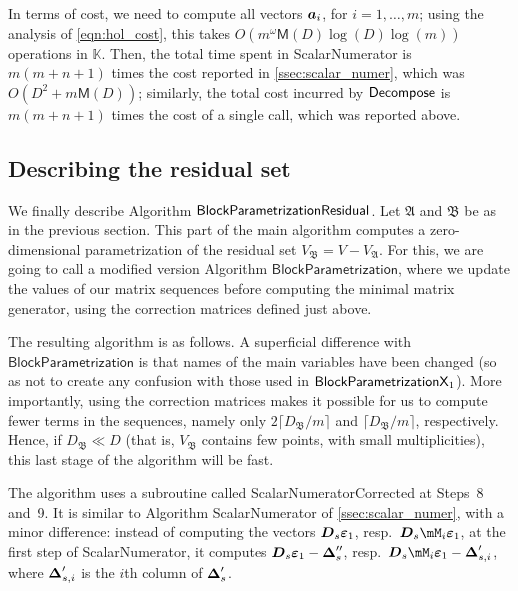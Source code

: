 \documentclass[12pt]{article}
\newcommand{\mat}[1]{\bm{\MakeUppercase{#1}}} %
\newcommand{\row}[1]{\bm{\MakeLowercase{#1}}} %
\newcommand{\col}[1]{\bm{\MakeLowercase{#1}}} %
\newcommand{\mainalgoname}{\mathsf{ BlockParametrization}}
\def\M {\ensuremath{\mathsf{M}}}
\def\K{\mathbb{K}}
\def\K {\ensuremath{\mathbb{K}}}
\begin{document}
In terms of cost, we need to compute all vectors $\row{a}_i$, for
$i=1,\dots,m$; using the analysis of \cref{eqn:hol_cost}, this takes
$O(m^{\omega} \M(D) \log(D) \log(m))$ operations in $\K$.  Then, the total time
spent in {\sf ScalarNumerator} is $m(m+n+1)$ times the cost reported in
\cref{ssec:scalar_numer}, which was $O(D^2 + m\M(D))$; similarly, the total
cost incurred by ${\sf Decompose}$ is $m(m+n+1)$ times the cost of a single
call, which was reported above.


\subsection{Describing the residual set}
 
We finally describe Algorithm $\mainalgoname{\sf Residual}$.  Let
$\mathfrak{A}$ and $\mathfrak{B}$ be as in the previous section.  This
part of the main algorithm computes a zero-dimensional parametrization
of the residual set $V_\mathfrak{B}=V-V_\mathfrak{A}$. For this, we
are going to call a modified version Algorithm
$\mathsf{BlockParametrization}$, where we update the values of our
matrix sequences before computing the minimal matrix generator, using
the correction matrices defined just above.

The resulting algorithm is as follows. A superficial difference with
$\mathsf{BlockParametrization}$ is that names of the main variables
have been changed (so as not to create any confusion with those used
in $\mainalgoname{\sf X}_1$). More importantly, using the correction
matrices makes it possible for us to compute fewer terms in the
sequences, namely only $2\lceil D_\mathfrak{B}/m\rceil$ and
$\lceil D_\mathfrak{B}/m\rceil$, respectively. Hence, if $D_\mathfrak{B} \ll D$
(that is, $V_\mathfrak{B}$ contains few points, with small
multiplicities), this last stage of the algorithm will be fast.

The algorithm uses a subroutine called {\sf ScalarNumeratorCorrected}
at Steps~8 and~9.  It is similar to Algorithm {\sf ScalarNumerator} of
\cref{ssec:scalar_numer}, with a minor difference: instead of computing the
vectors $\mat{D}_s \col{\varepsilon}_1$, resp.\ $\mat{D}_s\mM_i
\col{\varepsilon}_1$, at the first step of  {\sf ScalarNumerator}, it computes $\mat{D}_s
\col{\varepsilon}_1-\mat{\Delta}''_s$, resp.\ $\mat{D}_s\mM_i
\col{\varepsilon}_1-\mat{\Delta}'_{s,i}$, where $\mat{\Delta}'_{s,i}$
is the $i$th column of $\mat{\Delta}'_{s}$.
\end{document}
